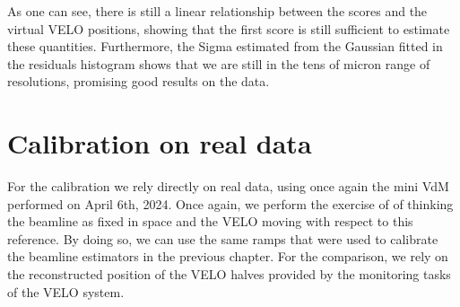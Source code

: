 As one can see, there is still a linear relationship between the scores and the virtual VELO positions, showing that the first score is still sufficient to estimate these quantities. Furthermore, the Sigma estimated from the Gaussian fitted in the residuals histogram shows that we are still in the tens of micron range of resolutions, promising good results on the data.


\section{Calibration on real data}
For the calibration we rely directly on real data, using once again the mini VdM performed on April 6th, 2024. 
Once again, we perform the exercise of of thinking the beamline as fixed in space and the VELO moving with respect to this reference. By doing so, we can use the same ramps that were used to calibrate the beamline estimators in the previous chapter. For the comparison, we rely on the reconstructed position of the VELO halves provided by the monitoring tasks of the VELO system. 

